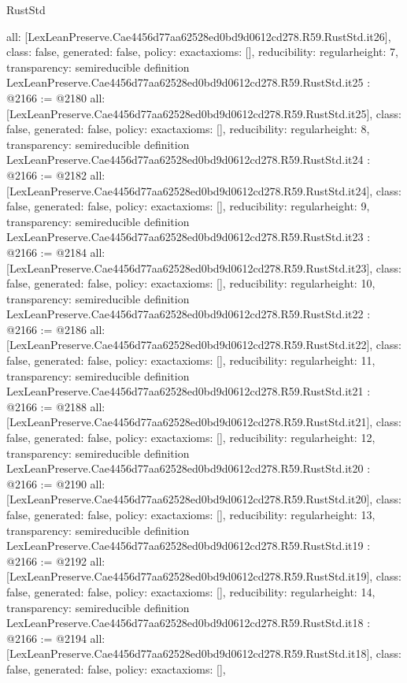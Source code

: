 \begin{lexlean}{RustStd}
\begin{coremodule}
{  all: [LexLeanPreserve.Cae4456d77aa62528ed0bd9d0612cd278.R59.RustStd.it26],
  class: false,
  generated: false,
  policy: exact{axioms: []},
  reducibility: regular{height: 7},
  transparency: semireducible
}
definition LexLeanPreserve.Cae4456d77aa62528ed0bd9d0612cd278.R59.RustStd.it25 : @2166 := @2180 {
  all: [LexLeanPreserve.Cae4456d77aa62528ed0bd9d0612cd278.R59.RustStd.it25],
  class: false,
  generated: false,
  policy: exact{axioms: []},
  reducibility: regular{height: 8},
  transparency: semireducible
}
definition LexLeanPreserve.Cae4456d77aa62528ed0bd9d0612cd278.R59.RustStd.it24 : @2166 := @2182 {
  all: [LexLeanPreserve.Cae4456d77aa62528ed0bd9d0612cd278.R59.RustStd.it24],
  class: false,
  generated: false,
  policy: exact{axioms: []},
  reducibility: regular{height: 9},
  transparency: semireducible
}
definition LexLeanPreserve.Cae4456d77aa62528ed0bd9d0612cd278.R59.RustStd.it23 : @2166 := @2184 {
  all: [LexLeanPreserve.Cae4456d77aa62528ed0bd9d0612cd278.R59.RustStd.it23],
  class: false,
  generated: false,
  policy: exact{axioms: []},
  reducibility: regular{height: 10},
  transparency: semireducible
}
definition LexLeanPreserve.Cae4456d77aa62528ed0bd9d0612cd278.R59.RustStd.it22 : @2166 := @2186 {
  all: [LexLeanPreserve.Cae4456d77aa62528ed0bd9d0612cd278.R59.RustStd.it22],
  class: false,
  generated: false,
  policy: exact{axioms: []},
  reducibility: regular{height: 11},
  transparency: semireducible
}
definition LexLeanPreserve.Cae4456d77aa62528ed0bd9d0612cd278.R59.RustStd.it21 : @2166 := @2188 {
  all: [LexLeanPreserve.Cae4456d77aa62528ed0bd9d0612cd278.R59.RustStd.it21],
  class: false,
  generated: false,
  policy: exact{axioms: []},
  reducibility: regular{height: 12},
  transparency: semireducible
}
definition LexLeanPreserve.Cae4456d77aa62528ed0bd9d0612cd278.R59.RustStd.it20 : @2166 := @2190 {
  all: [LexLeanPreserve.Cae4456d77aa62528ed0bd9d0612cd278.R59.RustStd.it20],
  class: false,
  generated: false,
  policy: exact{axioms: []},
  reducibility: regular{height: 13},
  transparency: semireducible
}
definition LexLeanPreserve.Cae4456d77aa62528ed0bd9d0612cd278.R59.RustStd.it19 : @2166 := @2192 {
  all: [LexLeanPreserve.Cae4456d77aa62528ed0bd9d0612cd278.R59.RustStd.it19],
  class: false,
  generated: false,
  policy: exact{axioms: []},
  reducibility: regular{height: 14},
  transparency: semireducible
}
definition LexLeanPreserve.Cae4456d77aa62528ed0bd9d0612cd278.R59.RustStd.it18 : @2166 := @2194 {
  all: [LexLeanPreserve.Cae4456d77aa62528ed0bd9d0612cd278.R59.RustStd.it18],
  class: false,
  generated: false,
  policy: exact{axioms: []},
}
\end{coremodule}
\end{lexlean}
